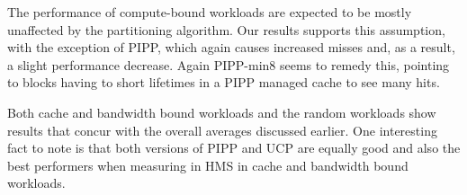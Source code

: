 The performance of compute-bound workloads are expected to be mostly unaffected by the partitioning algorithm. 
Our results supports this assumption, with the exception of PIPP, which again causes increased misses and, as a result, a slight performance decrease.
Again PIPP-min8 seems to remedy this, pointing to blocks having to short lifetimes in a PIPP managed cache to see many hits.

Both cache and bandwidth bound workloads and the random workloads show results that concur with the overall averages discussed earlier.
One interesting fact to note is that both versions of PIPP and UCP are equally good and also the best performers when measuring in HMS in cache and bandwidth bound workloads.
